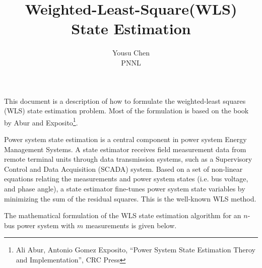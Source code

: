 \documentclass[12pt]{article}
\begin{document}
\title{Weighted-Least-Square(WLS) State Estimation}
\author{Yousu Chen \\PNNL}
\maketitle
This document is a description of how to formulate the weighted-least squares
(WLS) state estimation problem. Most of the formulation is based on the
book by Abur and Exposito\footnote{Ali Abur, Antonio Gomez Exposito, ``Power
System State Estimation Theroy and Implementation'', CRC Press }.

Power system state estimation is a central component in power system Energy
Management Systems. A state estimator receives field measurement data from
remote terminal units through data transmission systems, such as a Supervisory
Control and Data Acquisition (SCADA) system. Based on a set of non-linear
equations relating the measurements and power system states (i.e.  bus voltage,
and phase angle), a state estimator fine-tunes power system state variables by
minimizing the sum of the residual squares.  This is the well-known WLS method.

The mathematical formulation of the WLS state estimation algorithm for an
$n$-bus power system with $m$ measurements is given below.
\end{document}
